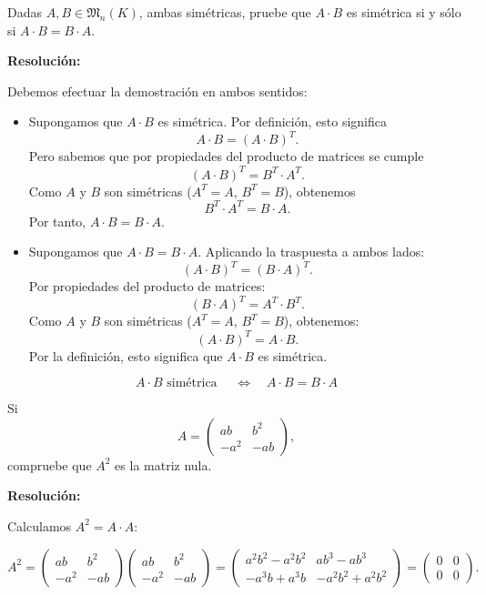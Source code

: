 \documentclass[a4paper,12pt]{article}
\begin{document}
\begin{ejercicio}[title=Ejercicio 3]
Dadas $A,B \in \mathfrak{M}_n(K)$, ambas simétricas, pruebe que $A \cdot B$ es simétrica si y sólo si $A \cdot B = B \cdot A$.

\tcblower
\textbf{Resolución:}

Debemos efectuar la demostración en ambos sentidos:

\begin{itemize}
    \item[$\boxed\Rightarrow$] Supongamos que $A\cdot B$ es simétrica.  
    Por definición, esto significa
    \[
    A\cdot B = (A\cdot B)^T.
    \] 
    Pero sabemos que por propiedades del producto de matrices se cumple
    \[
    (A\cdot B)^T = B^T \cdot A^T.
    \] 
    Como $A$ y $B$ son simétricas ($A^T = A$, $B^T = B$), obtenemos
    \[
    B^T \cdot A^T  = B \cdot A.
    \] 
    Por tanto, $A \cdot B = B \cdot A$.

    \item[$\boxed{\Leftarrow}$] Supongamos que $A \cdot B = B \cdot A$.  
    Aplicando la traspuesta a ambos lados:
    \[
    (A \cdot B)^T = (B \cdot A)^T.
    \] 
    Por propiedades del producto de matrices:
    \[
    (B \cdot A)^T = A^T \cdot B^T.
    \] 
    Como $A$ y $B$ son simétricas ($A^T = A$, $B^T = B$), obtenemos:
    \[
    (A \cdot B)^T = A \cdot B.
    \] 
    Por la definición, esto significa que $A \cdot B$ es simétrica.
\end{itemize}
\[
\boxed{A \cdot B \text{ simétrica } \quad \Longleftrightarrow \quad A \cdot B = B \cdot A}
\]

\end{ejercicio}

\begin{ejercicio}[title=Ejercicio 4]
Si 
\[
A = 
\begin{pmatrix}
ab & b^2\\
- a^2 & -ab
\end{pmatrix},
\]
compruebe que $A^2$ es la matriz nula.

\tcblower
\textbf{Resolución:}

Calculamos $A^2 = A \cdot A$:

\[
A^2 =
\begin{pmatrix}
ab & b^2\\
- a^2 & -ab
\end{pmatrix}
\begin{pmatrix}
ab & b^2\\
- a^2 & -ab
\end{pmatrix}
=\begin{pmatrix}
a^2 b^2 - a^2 b^2 & a b^3 - a b^3 \\
- a^3 b + a^3 b & - a^2 b^2 + a^2 b^2
\end{pmatrix}
=
\boxed{\begin{pmatrix}
0 & 0 \\
0 & 0
\end{pmatrix}}.
\]
\end{ejercicio}
\end{document}
